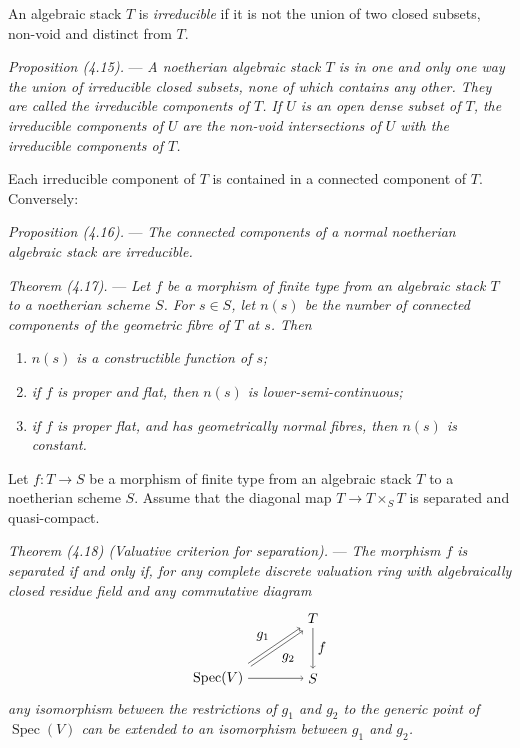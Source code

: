 \documentclass[10pt]{article}
\newcommand{\Spec}{\operatorname{Spec}}
\begin{document}
An algebraic stack $T$ is \emph{irreducible} if it is not the union of two closed subsets, non-void and distinct from $T$.

\medskip
\noindent\emph{Proposition (4.15).} --- \emph{A noetherian algebraic stack $T$ is in one and only one way the union of irreducible closed subsets, none of which contains any other. They are called the irreducible components of $T$. If $U$ is an open dense subset of $T$, the irreducible components of $U$ are the non-void intersections of $U$ with the irreducible components of $T$.}

Each irreducible component of $T$ is contained in a connected component of $T$. Conversely:

\medskip
\noindent\emph{Proposition (4.16).} --- \emph{The connected components of a normal noetherian algebraic stack are irreducible.}

\medskip
\noindent\emph{Theorem (4.17).} --- \emph{Let $f$ be a morphism of finite type from an algebraic stack $T$ to a noetherian scheme $S$. For $s\in S$, let $n(s)$ be the number of connected components of the geometric fibre of $T$ at $s$. Then}
\begin{enumerate}[label=(\roman*)]
\item \emph{$n(s)$ is a constructible function of $s$;}
\item \emph{if $f$ is proper and flat, then $n(s)$ is lower-semi-continuous;}
\item \emph{if $f$ is proper flat, and has geometrically normal fibres, then $n(s)$ is constant.}
\end{enumerate}

Let $f:T\to S$ be a morphism of finite type from an algebraic stack $T$ to a noetherian scheme $S$. Assume that the diagonal map $T\to T\times_S T$ is separated and quasi-compact.

\medskip
\noindent\emph{Theorem (4.18) (Valuative criterion for separation).} --- \emph{The morphism $f$ is separated if and only if, for any complete discrete valuation ring with algebraically closed residue field and any commutative diagram}
\[
\begin{tikzpicture}[baseline=(current bounding box.center)]
\node (T) at (2.4,1.5) {$T$};
\node (V) at (0,0) {$\Spec(V)$};
\node (S) at (2.4,0) {$S$};
\draw[->] ([yshift=2pt]V.north east) -- node[above left] {$g_1$} ([xshift=-2pt]T.south west);
\draw[->] ([xshift=2pt]V.north east) -- node[below right] {$g_2$} ([yshift=-2pt]T.south west);
\draw[->] (V) -- (S);
\draw[->] (T) -- node[right] {$f$} (S);
\end{tikzpicture}
\]
\emph{any isomorphism between the restrictions of $g_1$ and $g_2$ to the generic point of $\Spec(V)$ can be extended to an isomorphism between $g_1$ and $g_2$.}
\end{document}
